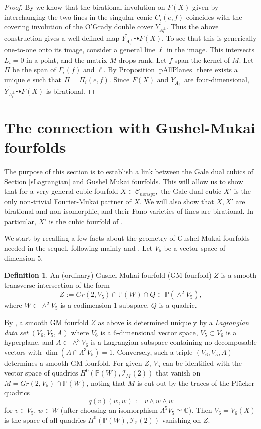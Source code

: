 \documentclass[11pt]{amsart}
\theoremstyle{plain}
\numberwithin{equation}{section}
\theoremstyle{definition}
\newtheorem{definition}[theorem]{Definition}
\theoremstyle{remark}
\newcommand{\bP}{\mathbb{P}}
\newcommand{\bC}{\mathbb{C}}
\newcommand{\calC}{\mathcal{C}}
\begin{document}
\begin{proof}
By  \cite[Remark 3.3 and comments after Prop. 3.7]{BFMQ24} we know that the birational involution on $F(X)$ given by interchanging the two lines in the singular conic $C_i(e,f)$ coincides with the covering involution of the O'Grady double cover $\widetilde{Y_{A_i^\perp}}$. Thus the above construction gives a well-defined map $\widetilde{Y_{A_i^\perp}} \dashrightarrow F(X)$. To see that this is generically one-to-one onto its image, consider a general line $\ell$ in the image. This intersects $L_i=0$ in a point, and the matrix $M$ drops rank. Let $f$ span the kernel of $M$. Let $\Pi$ be the span of $\Gamma_i(f)$ and $\ell$. By Proposition \ref{pAllPlanes} there exists a unique $e$ such that $\Pi = \Pi_i(e,f)$. Since $F(X)$ and $Y_{A_i^\perp}$ are four-dimensional, $\widetilde{Y_{A_i^\perp}} \dashrightarrow F(X)$ is birational.
\end{proof}
 

\section{The connection with Gushel-Mukai fourfolds}\label{sGM}
The purpose of this section is to establish a link between the Gale dual cubics of Section \ref{sLagrangian} and Gushel Mukai fourfolds. This will allow us to show that for a very  general cubic fourfold $X\in \calC_{nonsyz},$ the Gale dual cubic $X'$ is the only non-trivial Fourier-Mukai partner of $X$. We will also show that $X, X'$ are birational and non-isomorphic, and their Fano varieties of lines are birational. In particular, $X'$ is the cubic fourfold of \cite[Theorem 3.1]{Brooke:2024aa}.

We start by recalling a few facts about the geometry of Gushel-Mukai fourfolds needed in the sequel, following mainly \cite{KuzPerry} and \cite{DK1}. Let $V_5$ be a vector space of dimension $5$.

\begin{definition}
    An (ordinary) Gushel-Mukai fourfold (GM fourfold) $Z$ is a smooth transverse intersection of the form $$Z:=Gr(2, V_5)\cap \bP(W)\cap Q\subset \bP(\wedge^2V_5),$$ where $W\subset \wedge^2 V_5$ is a codimension 1 subspace, $Q$ is a quadric.
\end{definition}
By \cite[Thm. 3.10]{DK1}, a smooth GM fourfold $Z$ as above is determined uniquely by a \textit{Lagrangian data set} $(V_6,V_5, A)$ where $V_6$ is a 6-dimensional vector space, $V_5\subset V_6$ is a hyperplane, and $A\subset \wedge^3V_6$ is a Lagrangian subspace containing no decomposable vectors with $\dim (A\cap \Lambda^3 V_5)=1$.  Conversely, such a triple $(V_6, V_5, A)$ determines a smooth GM fourfold. For given $Z$, $V_5$ can be identified with the vector space of quadrics $H^0 (\bP(W), \mathcal{I}_M(2))$ that vanish on $M = Gr(2, V_5)\cap \bP(W)$, noting that $M$ is cut out by the traces of the Pl\"ucker quadrics
\[
q(v)(w, w):= v\wedge w\wedge w
\]
for $v\in V_5$, $w\in W$ (after choosing an isomorphism $\Lambda^5 V_5 \simeq \bC$). Then $V_6=V_6(X)$ is the space of all quadrics $H^0 (\bP(W), \mathcal{I}_Z(2))$ vanishing on $Z$. 
\end{document}
